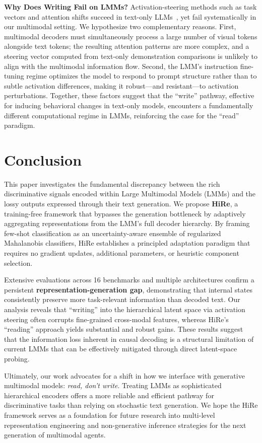 \documentclass[sigconf,review,anonymous,9pt,table]{acmart}
\newcommand{\minisection}[1]{\smallskip\noindent\textbf{#1}}
\begin{document}
\minisection{Why Does Writing Fail on LMMs?}
Activation-steering methods such as task vectors and attention shifts succeed in text-only LLMs~\cite{ma2026and}, yet fail systematically in our multimodal setting.
We hypothesize two complementary reasons.
First, multimodal decoders must simultaneously process a large number of visual tokens alongside text tokens; the resulting attention patterns are more complex, and a steering vector computed from text-only demonstration comparisons is unlikely to align with the multimodal information flow.
Second, the LMM's instruction fine-tuning regime optimizes the model to respond to prompt structure rather than to subtle activation differences, making it robust—and resistant—to activation perturbations.
Together, these factors suggest that the ``write'' pathway, effective for inducing behavioral changes in text-only models, encounters a fundamentally different computational regime in LMMs, reinforcing the case for the ``read'' paradigm.

\section{Conclusion}
This paper investigates the fundamental discrepancy between the rich discriminative signals encoded within Large Multimodal Models (LMMs) and the lossy outputs expressed through their text generation. 
We propose \textbf{HiRe}, a training-free framework that bypasses the generation bottleneck by adaptively aggregating representations from the LMM's full decoder hierarchy. 
By framing few-shot classification as an uncertainty-aware ensemble of regularized Mahalanobis classifiers, HiRe establishes a principled adaptation paradigm that requires no gradient updates, additional parameters, or heuristic component selection.

Extensive evaluations across 16 benchmarks and multiple architectures confirm a persistent \textbf{representation-generation gap}, demonstrating that internal states consistently preserve more task-relevant information than decoded text. 
Our analysis reveals that ``writing'' into the hierarchical latent space via activation steering often corrupts fine-grained cross-modal features, whereas HiRe's ``reading'' approach yields substantial and robust gains. 
These results suggest that the information loss inherent in causal decoding is a structural limitation of current LMMs that can be effectively mitigated through direct latent-space probing.

Ultimately, our work advocates for a shift in how we interface with generative multimodal models: \emph{read, don't write}. 
Treating LMMs as sophisticated hierarchical encoders offers a more reliable and efficient pathway for discriminative tasks than relying on stochastic text generation. 
We hope the HiRe framework serves as a foundation for future research into multi-level representation engineering and non-generative inference strategies for the next generation of multimodal agents.
\end{document}
